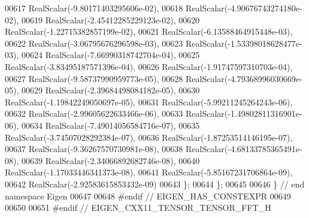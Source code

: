 \begin{DoxyCode}
00617     RealScalar(-9.80171403295606e-02),
00618     RealScalar(-4.90676743274180e-02),
00619     RealScalar(-2.45412285229123e-02),
00620     RealScalar(-1.22715382857199e-02),
00621     RealScalar(-6.13588464915448e-03),
00622     RealScalar(-3.06795676296598e-03),
00623     RealScalar(-1.53398018628477e-03),
00624     RealScalar(-7.66990318742704e-04),
00625     RealScalar(-3.83495187571396e-04),
00626     RealScalar(-1.91747597310703e-04),
00627     RealScalar(-9.58737990959773e-05),
00628     RealScalar(-4.79368996030669e-05),
00629     RealScalar(-2.39684498084182e-05),
00630     RealScalar(-1.19842249050697e-05),
00631     RealScalar(-5.99211245264243e-06),
00632     RealScalar(-2.99605622633466e-06),
00633     RealScalar(-1.49802811316901e-06),
00634     RealScalar(-7.49014056584716e-07),
00635     RealScalar(-3.74507028292384e-07),
00636     RealScalar(-1.87253514146195e-07),
00637     RealScalar(-9.36267570730981e-08),
00638     RealScalar(-4.68133785365491e-08),
00639     RealScalar(-2.34066892682746e-08),
00640     RealScalar(-1.17033446341373e-08),
00641     RealScalar(-5.85167231706864e-09),
00642     RealScalar(-2.92583615853432e-09)
00643   \};
00644 \};
00645 
00646 \}  \textcolor{comment}{// end namespace Eigen}
00647 
00648 \textcolor{preprocessor}{#endif  // EIGEN\_HAS\_CONSTEXPR}
00649 
00650 
00651 \textcolor{preprocessor}{#endif  // EIGEN\_CXX11\_TENSOR\_TENSOR\_FFT\_H}
\end{DoxyCode}

